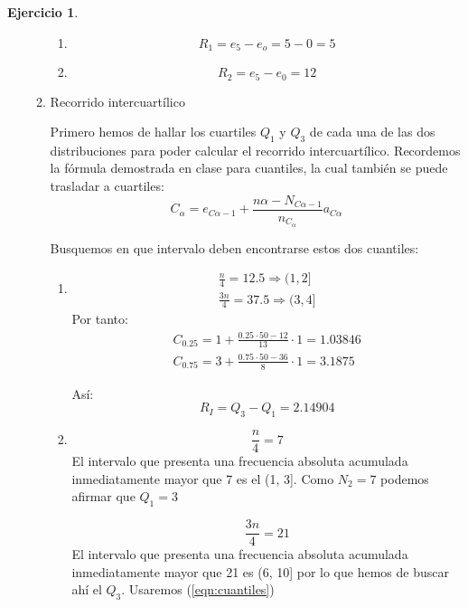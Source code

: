 \documentclass[a4paper, 12pt]{article}
\theoremstyle{definition}
\newtheorem{ej}{Ejercicio}
\begin{document}
\begin{ej}
\begin{enumerate}[label=\textit{\alph*)}]
\begin{enumerate}[label=\arabic*)]
    \begin{enumerate}[label=(\arabic*)]
        \item 
        \[
        R_1 = e_5 - e_o = 5 - 0 = 5
        \]
        
        \item
        \[
        R_2 = e_5 - e_0 = 12
        \]
    \end{enumerate}
    
    \item Recorrido intercuartílico
    
    Primero hemos de hallar los cuartiles \(Q_1\) y \(Q_3\) de cada una de las dos distribuciones para poder calcular el recorrido intercuartílico. Recordemos la fórmula demostrada en clase para cuantiles, la cual también se puede trasladar a cuartiles:
    \begin{equation}\label{eqn:cuantiles}
        C_\alpha = e_{C\alpha - 1} + \frac{n\alpha - N_{C\alpha - 1}}{n_{C_\alpha}}a_{C\alpha}
    \end{equation}
    
    Busquemos en que intervalo deben encontrarse estos dos cuantiles:
    \begin{enumerate}[label=(\arabic*)]
        \item 

    \begin{align*}
    \frac{n}{4} = 12.5 \Rightarrow (1,2] \\
    \frac{3n}{4} = 37.5 \Rightarrow (3,4]
    \end{align*}
    Por tanto:
    \begin{align*}
        C_{0.25} = 1 + \frac{0.25 \cdot 50 - 12}{13} \cdot 1 = 1.03846 \\
        C_{0.75} = 3 + \frac{0.75 \cdot 50 - 36}{8} \cdot 1 = 3.1875
    \end{align*}
    
    Así:
    \[
    R_I = Q_3 - Q_1 = 2.14904
    \]
    
    \item
    
    \[
    \frac{n}{4} = 7
    \]
    El intervalo que presenta una frecuencia absoluta acumulada inmediatamente mayor que 7 es el (1, 3]. Como \(N_2 = 7\) podemos afirmar que \(Q_1 = 3\)
    
    \[
    \frac{3n}{4} = 21
    \]
    El intervalo que presenta una frecuencia absoluta acumulada inmediatamente mayor que 21 es (6, 10] por lo que hemos de buscar ahí el \(Q_3\). Usaremos (\ref{eqn:cuantiles})
    

\end{enumerate}
\end{enumerate}
\end{enumerate}
\end{ej}
\end{document}
